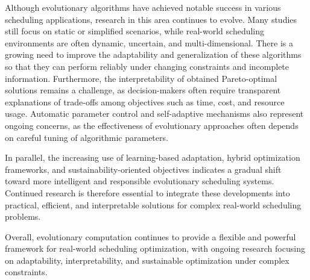 \documentclass[a4paper,12pt]{article}
\begin{document}
Although evolutionary algorithms have achieved notable success in various scheduling applications, research in this area continues to evolve. Many studies still focus on static or simplified scenarios, while real-world scheduling environments are often dynamic, uncertain, and multi-dimensional. There is a growing need to improve the adaptability and generalization of these algorithms so that they can perform reliably under changing constraints and incomplete information. Furthermore, the interpretability of obtained Pareto-optimal solutions remains a challenge, as decision-makers often require transparent explanations of trade-offs among objectives such as time, cost, and resource usage. Automatic parameter control and self-adaptive mechanisms also represent ongoing concerns, as the effectiveness of evolutionary approaches often depends on careful tuning of algorithmic parameters. 

In parallel, the increasing use of learning-based adaptation, hybrid optimization frameworks, and sustainability-oriented objectives indicates a gradual shift toward more intelligent and responsible evolutionary scheduling systems. Continued research is therefore essential to integrate these developments into practical, efficient, and interpretable solutions for complex real-world scheduling problems.


Overall, evolutionary computation continues to provide a flexible and powerful framework for real-world scheduling optimization, with ongoing research focusing on adaptability, interpretability, and sustainable optimization under complex constraints.
\end{document}
